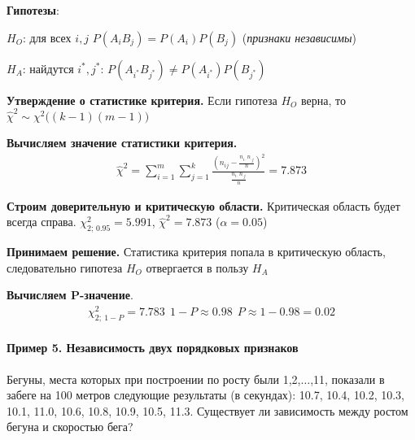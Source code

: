 \documentclass[12pt]{extarticle}
\begin{document}
\par\textbf{Гипотезы}:
\begin{description}
    \item $H_{O}$: для всех $i,j$ $P(A_{i}B_{j})=P(A_{i})P(B_{j})$
        (\textit{признаки независимы})
    \item $H_{A}$: найдутся
        $i^{*},j^{*}:\,P(A_{i^{*}}B_{j^{*}})\neq
        P(A_{i^{*}})P(B_{j^{*}})$
\end{description}

\par\textbf{Утверждение о статистике критерия.} Если гипотеза $H_{O}$
верна, то $\hat{\chi}^{2}\sim\chi^{2}\Big((k-1)(m-1)\Big)$

\par\textbf{Вычисляем значение статистики критерия.}
\begin{eqnarray*}
    \hat{\chi}^{2}
    =\sum\limits_{i=1}^{m}\sum\limits_{j=1}^{k}
    \frac{\left(n_{ij}-\frac{n_{i\cdot}n_{\cdot j}}{n}\right)^{2}}
    {\frac{n_{i\cdot}n_{\cdot j}}{n}}
    =7.873
\end{eqnarray*}

\par\textbf{Строим доверительную и критическую области.} Критическая
область будет всегда справа. $\chi^{2}_{2;\,0.95}=5.991$,
$\hat{\chi}^{2}=7.873$ ($\alpha=0.05$)

\par\textbf{Принимаем решение.} Статистика критерия попала в критическую
область, следовательно гипотеза $H_{O}$ отвергается в пользу $H_{A}$

\par\textbf{Вычисляем P-значение}.
\begin{eqnarray*}
    \chi^{2}_{2;\ 1-P}=7.783
    \ \ 1-P\approx 0.98
    \ \ P\approx 1-0.98=0.02
\end{eqnarray*}

\paragraph{Пример 5. Независимость двух порядковых признаков}
Бегуны, места которых при построении по росту были 1,2,$\ldots$,11,
показали в забеге на 100 метров следующие результаты (в секундах):
10.7, 10.4, 10.2, 10.3, 10.1, 11.0, 10.6, 10.8, 10.9, 10.5, 11.3.
Существует ли зависимость между ростом бегуна и скоростью бега?
\end{document}
